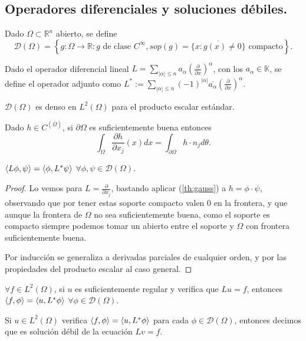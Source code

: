 \subsection{Operadores diferenciales y soluciones débiles.}

\begin{definition}
  Dado $\Omega\subset \mathbb{R}^n$ abierto, se define
  \[
  \mathcal{D}(\Omega)=\left\{g:\Omega\to \mathbb{R}:g\text{ de clase
  }C^\infty,sop(g)=\overline{\{x:g(x)\neq 0\} } \text{ compacto}\right\} 
  .\] 
\end{definition}

\begin{definition}
  Dado el operador diferencial lineal $L=\sum_{|\alpha|\le n}a_\alpha\left(
  \frac{\partial}{\partial x} \right)^\alpha$, con los $a_\alpha\in \mathbb{K}$,
  se define el operador adjunto como $L^*:=\sum_{|\alpha|\le
  n}(-1)^{|\alpha|}\overline{a_\alpha}\left( \frac{\partial}{\partial x}
\right)^\alpha$.
\end{definition}

\begin{lemma}[Regularización]
  $\mathcal{D}(\Omega)$ es denso en $L^2(\Omega)$ para el producto escalar
  estándar.
\end{lemma}

\begin{theorem}[Gauss]\label{th:gauss}
  Dado $h\in C^(\overline{\Omega})$, si $\partial \Omega$ es suficientemente
  buena entonces
  \[
    \int_\Omega \frac{\partial h}{\partial x_j} (x)dx=
    \int_{\partial \Omega} h\cdot n_j d\theta
  .\] 
\end{theorem}

\begin{proposition}
  $\left\langle L\phi,\psi\right\rangle=\left\langle\phi,L^*\psi\right\rangle$ $\forall \phi,\psi \in
  \mathcal{D}(\Omega)$.
\end{proposition}

\begin{proof}
  Lo vemos para $L=\frac{\partial }{\partial x_j} $, bastando aplicar
  (\ref{th:gauss}) a $h=\phi\cdot \psi$, observando que por tener estas soporte
  compacto valen $0$ en la frontera, y que aunque la frontera de $\Omega$ no sea
  suficientemente buena, como el soporte es compacto siempre podemos tomar un
  abierto entre el soporte y $\Omega$ con frontera suficientemente buena.

  Por inducción se generaliza a derivadas parciales de cualquier orden, y por
las propiedades del producto escalar al caso general.
\end{proof}

\begin{corollary}
  $\forall f\in L^2(\Omega)$, si $u$ es suficientemente regular y verifica que
  $Lu=f$, entonces $\left\langle f,\phi\right\rangle=\left\langle u,L^* \phi\right\rangle$ $\forall \phi \in
  \mathcal{D}(\Omega)$.
\end{corollary}

\begin{definition}
  Si $u\in L^2(\Omega)$ verifica $\left\langle f,\phi\right\rangle=\left\langle u,L^* \phi\right\rangle$ para cada
  $\phi \in \mathcal{D}(\Omega)$, entonces decimos que es solución débil de la
  ecuación $Lv=f$.
\end{definition}
